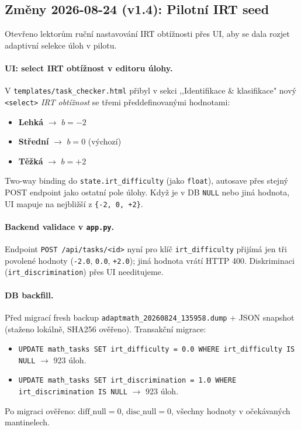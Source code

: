 \documentclass[11pt,a4paper]{article}
\begin{document}
\subsection{Změny 2026-08-24 (v1.4): Pilotní IRT seed}

Otevřeno lektorům ruční nastavování IRT obtížnosti přes UI, aby se dala rozjet adaptivní selekce úloh v pilotu.

\paragraph{UI: select IRT obtížnost v editoru úlohy.} V \texttt{templates/task\_checker.html} přibyl v sekci ,,Identifikace \& klasifikace" nový \texttt{<select>} \emph{IRT obtížnost} se třemi předdefinovanými hodnotami:
\begin{itemize}
  \item \textbf{Lehká} $\rightarrow$ $b = -2$
  \item \textbf{Střední} $\rightarrow$ $b = 0$ (výchozí)
  \item \textbf{Těžká} $\rightarrow$ $b = +2$
\end{itemize}
Two-way binding do \texttt{state.irt\_difficulty} (jako \texttt{float}), autosave přes stejný POST endpoint jako ostatní pole úlohy. Když je v DB \texttt{NULL} nebo jiná hodnota, UI mapuje na nejbližší z \texttt{\{-2, 0, +2\}}.

\paragraph{Backend validace v \texttt{app.py}.} Endpoint \texttt{POST /api/tasks/<id>} nyní pro klíč \texttt{irt\_difficulty} přijímá jen tři povolené hodnoty (\texttt{-2.0}, \texttt{0.0}, \texttt{+2.0}); jiná hodnota vrátí HTTP 400. Diskriminaci (\texttt{irt\_dis\-cri\-mi\-na\-tion}) přes UI needitujeme.

\paragraph{DB backfill.} Před migrací fresh backup \texttt{adaptmath\_20260824\_135958.dump} + JSON snapshot (staženo lokálně, SHA256 ověřeno). Transakční migrace:
\begin{itemize}
  \item \texttt{UPDATE math\_tasks SET irt\_difficulty = 0.0 WHERE irt\_difficulty IS NULL} $\rightarrow$ 923 úloh.
  \item \texttt{UPDATE math\_tasks SET irt\_discrimination = 1.0 WHERE irt\_discrimination IS NULL} $\rightarrow$ 923 úloh.
\end{itemize}
Po migraci ověřeno: $\text{diff\_null} = 0$, $\text{disc\_null} = 0$, všechny hodnoty v očekávaných mantinelech.
\end{document}
